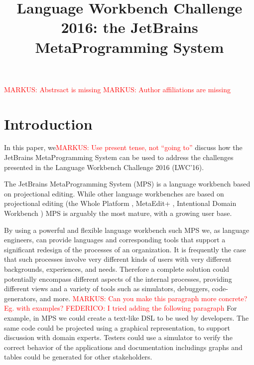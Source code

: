 \documentclass[preprint,numbers,10pt]{sigplanconf}
\newcommand\markus[1]{\textcolor{red}{MARKUS: {#1}}}
\newcommand\federico[1]{\textcolor{red}{FEDERICO: {#1}}}
\begin{document}
\title{Language Workbench Challenge 2016: the JetBrains MetaProgramming System}


\maketitle

%
%

\markus{Abstrsact is missing}
\markus{Author affiliations are missing}


\section{Introduction}



In this paper, we\markus{Use present tense, not ``going to''} discuss how the
JetBrains MetaProgramming System can be used to address the challenges presented in the Language Workbench
Challenge 2016 (LWC'16).

The JetBrains MetaProgramming System (MPS) is a language workbench based
on projectional editing. While other language workbenches are based on
projectional editing (the Whole Platform \cite{solmi2005whole}, MetaEdit+
\cite{Tolvanen2006}, Intentional Domain Workbench \cite{Simonyi2006}) MPS is
arguably the most mature, with a growing user base.

By using a powerful and flexible language workbench such MPS we, as language
engineers, can provide languages and corresponding tools that support a
significant redesign of the processes of an organization. 
It is frequently the case that such processes involve very different kinds of users with very
different backgrounds, experiences, and needs. Therefore a complete solution
could potentially encompass different aspects of the internal processes,
providing different views and a variety of tools such as simulators, debuggers,
code-generators, and more.
\markus{Can you make this paragraph more concrete?
Eg. with examples?}
\federico{I tried adding the following paragraph}
For example, in MPS we could create a text-like DSL to be used by developers. The same code could be projected using a graphical representation, to support discussion with domain experts. Testers could use a simulator to verify the correct behavior of the applications and documentation includings graphs and tables could be generated for other stakeholders.
\end{document}
